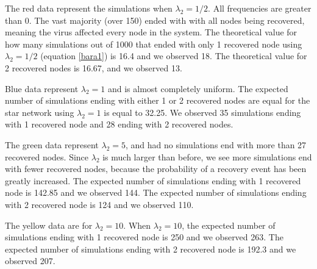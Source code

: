 \documentclass[12pt]{article} %
\numberwithin{equation}{section}
\begin{document}
The red data represent the simulations when $\lambda_2 = 1/2$. All frequencies are greater than 0. The vast majority (over 150) ended with with all nodes being recovered, meaning the virus affected every node in the system. The theoretical value for how many simulations out of 1000 that ended with only 1 recovered node using $\lambda_2 = 1/2$ (equation \ref{bara1}) is 16.4 and we observed 18. The theoretical value for 2 recovered nodes is 16.67, and we observed 13. 

Blue data represent $\lambda_2 = 1$ and is almost completely uniform. The expected number of simulations ending with either 1 or 2 recovered nodes are equal for the star network using $\lambda_2 = 1$ is equal to 32.25. We observed 35 simulations ending with 1 recovered node and 28 ending with 2 recovered nodes.

The green data represent $\lambda_2=5$, and had no simulations end with more than 27 recovered nodes. Since $\lambda_2$ is much larger than before, we see more simulations end with fewer recovered nodes, because the probability of a recovery event has been greatly increased. The expected number of simulations ending with 1 recovered node is 142.85 and we observed 144. The expected number of simulations ending with 2 recovered node is 124 and we observed 110.


The yellow data are for $\lambda_2 = 10$. When $\lambda_2 = 10$, the expected number of simulations ending with 1 recovered node is 250 and we observed 263. The expected number of simulations ending with 2 recovered node is 192.3 and we observed 207.
\end{document}
